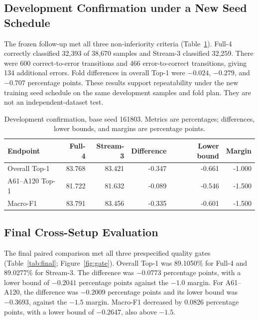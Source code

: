\documentclass[ai,article,submit,moreauthors]{Definitions/mdpi}
\begin{document}
\subsection{Development Confirmation under a New Seed Schedule}

The frozen follow-up met all three non-inferiority criteria (Table~\ref{tab:development}).
Full-4 correctly classified 32,393 of 38,670 samples and Stream-3 classified
32,259. There were 600 correct-to-error transitions and 466 error-to-correct
transitions, giving 134 additional errors. Fold differences in overall Top-1
were $-0.024$, $-0.279$, and $-0.707$ percentage points. These results
support repeatability under the new training seed schedule on the same
development samples and fold plan. They are not an independent-dataset test.

\begin{table}[H]
\centering\small\setlength{\tabcolsep}{3pt}
\caption{Development confirmation, base seed 161803. Metrics are percentages;
differences, lower bounds, and margins are percentage points.}
\label{tab:development}
\begin{tabular}{lrrrrr}
\toprule
Endpoint & Full-4 & Stream-3 & Difference & Lower bound & Margin\\
\midrule
Overall Top-1 & 83.768 & 83.421 & -0.347 & -0.661 & -1.000\\
A61--A120 Top-1 & 81.722 & 81.632 & -0.089 & -0.546 & -1.500\\
Macro-F1 & 83.791 & 83.456 & -0.335 & -0.601 & -1.500\\
\bottomrule
\end{tabular}
\end{table}

\subsection{Final Cross-Setup Evaluation}

The final paired comparison met all three prespecified quality
gates (Table~\ref{tab:final}; Figure~\ref{fig:gate}). Overall Top-1 was
89.1050\% for Full-4 and 89.0277\% for Stream-3. The difference was
$-0.0773$ percentage points, with a lower bound of $-0.2041$ percentage
points against the $-1.0$ margin. For A61--A120, the difference was
$-0.2009$ percentage points and its lower bound was $-0.3693$, against
the $-1.5$ margin. Macro-F1 decreased by 0.0826 percentage points, with a
lower bound of $-0.2647$, also above $-1.5$.

\begin{table}[H]
\centering\small\setlength{\tabcolsep}{3pt}\setlength{\tabcolsep}{3pt}
\caption{Final paired XSet comparison from the four saved stream
logit files. Metrics are percentages; differences, lower bounds, and margins
are percentage points. All three criteria are met.}
\label{tab:final}

\end{table}
\end{document}

